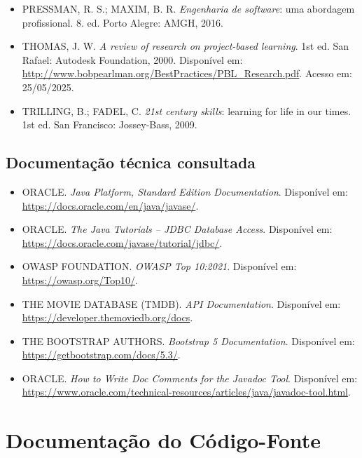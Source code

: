 \documentclass[12pt,a4paper]{article}
\begin{document}
\begin{itemize}[leftmargin=1.2cm]
        22, e11815, 2022 (CC BY 4.0) | ISSN 2447-1801 | DOI:
        \url{https://doi.org/10.15628/rbept.2022.11815}. Acesso em: 05/04/2025.
    \item PRESSMAN, R. S.; MAXIM, B. R. \textit{Engenharia de software}: uma abordagem
        profissional. 8. ed. Porto Alegre: AMGH, 2016.
    \item THOMAS, J. W. \textit{A review of research on project-based learning}. 1st ed. San
        Rafael: Autodesk Foundation, 2000. Disponível em:
        \url{http://www.bobpearlman.org/BestPractices/PBL_Research.pdf}. Acesso em: 25/05/2025.
    \item TRILLING, B.; FADEL, C. \textit{21st century skills}: learning for life in our times.
        1st ed. San Francisco: Jossey-Bass, 2009.
\end{itemize}

\subsection{Documentação técnica consultada}

\begin{itemize}[leftmargin=1.2cm]
    \item ORACLE. \textit{Java Platform, Standard Edition Documentation}. Disponível em:
        \url{https://docs.oracle.com/en/java/javase/}.
    \item ORACLE. \textit{The Java Tutorials -- JDBC Database Access}. Disponível em:
        \url{https://docs.oracle.com/javase/tutorial/jdbc/}.
    \item OWASP FOUNDATION. \textit{OWASP Top 10:2021}. Disponível em:
        \url{https://owasp.org/Top10/}.
    \item THE MOVIE DATABASE (TMDB). \textit{API Documentation}. Disponível em:
        \url{https://developer.themoviedb.org/docs}.
    \item THE BOOTSTRAP AUTHORS. \textit{Bootstrap 5 Documentation}. Disponível em:
        \url{https://getbootstrap.com/docs/5.3/}.
    \item ORACLE. \textit{How to Write Doc Comments for the Javadoc Tool}. Disponível em:
        \url{https://www.oracle.com/technical-resources/articles/java/javadoc-tool.html}.
\end{itemize}

\section{Documentação do Código-Fonte}
\end{document}

